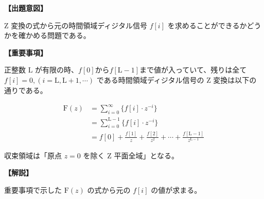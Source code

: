\noindent \textbf{【出題意図】}

\bigskip
\noindent Z 変換の式から元の時間領域ディジタル信号 $f[i]$ を求めることができるかどうかを確かめる問題である。

\vspace{1em}
\noindent \textbf{【重要事項】}

\medskip
正整数 $\textrm{L}$ が有限の時、$f[0]$から$f[\textrm{L}-1]$まで値が入っていて、残りは全て $f[i]=0, (i=\textrm{L},\textrm{L}+1,\cdots)$ である時間領域ディジタル信号の Z 変換は以下の通りである。

\begin{align*}
\textrm{F}(z) 
& = \sum_{i=0}^\infty \{ f[i] \cdot z^{-i} \} \\
& = \sum_{i=0}^{\textrm{L}-1} \{ f[i] \cdot z^{-i} \} \\
& = f[0] + \frac{f[1]}{z} + \frac{f[2]}{z^2} + \cdots + \frac{f[\textrm{L}-1]}{z^{\textrm{L}-1}}
\end{align*}

\medskip
\noindent 収束領域は「原点 $z=0$ を除く Z 平面全域」となる。

\bigskip

\vspace{1em}
\noindent \textbf{【解説】}

\bigskip
\noindent 重要事項で示した $\textrm{F}(z)$ の式から元の $f[i]$ の値が求まる。
